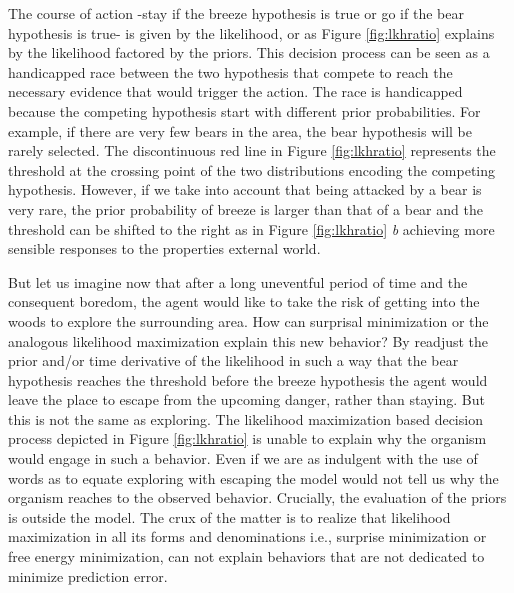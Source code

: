 \documentclass[11pt,twocolumn]{article}
\begin{document}
The course of action -stay if the breeze hypothesis is true or go if the bear hypothesis is true- is given by the likelihood, or as Figure \ref{fig:lkhratio} explains by the likelihood factored by the priors. This decision process can be seen as a handicapped race between the two hypothesis that compete to reach the necessary evidence that would trigger the action. The race is handicapped because the competing hypothesis start with different prior probabilities. For example, if there are very few bears in the area, the bear hypothesis will be rarely selected. 
The discontinuous red line in  Figure \ref{fig:lkhratio} represents the threshold at the crossing point of the two distributions encoding the competing hypothesis. 
However, if we take into account that being attacked by a bear is very rare, the prior probability of breeze is larger than that of a bear and the threshold can be shifted to the right as in Figure  \ref{fig:lkhratio} \emph{b} achieving more sensible responses to the properties external world.
     
But let us imagine now that after a long uneventful period of time and the consequent boredom, the agent would like to take the risk of getting into the woods to explore the surrounding area. 
How can surprisal minimization or the analogous likelihood maximization explain this new behavior? By readjust the prior and/or time derivative of the likelihood in such a way that the bear hypothesis reaches the threshold before the breeze hypothesis the agent would leave the place to escape from the upcoming danger, rather than staying. But this is not the same as exploring. 
The likelihood maximization based decision process depicted in Figure \ref{fig:lkhratio} is unable to explain why the organism would engage in such a behavior. Even if we are as indulgent with the use of words as to equate exploring with escaping the model would not tell us why the organism reaches to the observed behavior. Crucially, the evaluation of the priors is outside the model. 
The crux of the matter is to realize that likelihood maximization in all its forms and denominations i.e., surprise minimization or free energy minimization, can not explain behaviors that are not dedicated to minimize prediction error.
\end{document}
